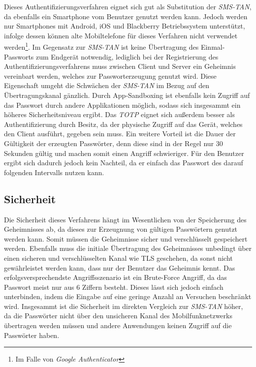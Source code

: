 \documentclass[11pt,a4paper,ngerman]{scrreprt}
\begin{document}
Dieses Authentifizierungsverfahren eignet sich gut als Substitution der \textit{SMS-TAN}, da ebenfalls ein Smartphone vom Benutzer genutzt werden kann. Jedoch werden nur Smartphones mit Android, iOS und Blackberry Betriebssystem unterstützt, infolge dessen können alte Mobiltelefone für dieses Verfahren nicht verwendet werden\footnote{Im Falle von \textit{Google Authenticator}}. Im Gegensatz zur \textit{SMS-TAN} ist keine Übertragung des Einmal-Passworts zum Endgerät notwendig, lediglich bei der Registrierung des Authentifizierungsverfahrens muss zwischen Client und Server ein Geheimnis vereinbart werden, welches zur Passworterzeugung genutzt wird. Diese Eigenschaft umgeht die Schwächen der \textit{SMS-TAN} im Bezug auf den Übertragungskanal gänzlich. Durch App-Sandboxing ist ebenfalls kein Zugriff auf das Passwort durch andere Applikationen möglich, sodass sich insgesammt ein höheres Sicherheitsniveau ergibt. Das \textit{TOTP} eignet sich außerdem besser als Authentifizierung durch Besitz, da der physische Zugriff auf das Gerät, welches den Client ausführt, gegeben sein muss. Ein weitere Vorteil ist die Dauer der Gültigkeit der erzeugten Passwörter, denn diese sind in der Regel nur 30 Sekunden gültig und machen somit einen Angriff schwieriger. Für den Benutzer ergibt sich dadurch jedoch kein Nachteil, da er einfach das Passwort des darauf folgenden Intervalls nutzen kann.

\subsection{Sicherheit}
Die Sicherheit dieses Verfahrens hängt im Wesentlichen von der Speicherung des Geheimnisses ab, da dieses zur Erzeugnung von gültigen Passwörtern genutzt werden kann. Somit müssen die Geheimnisse sicher und verschlüsselt gespeichert werden. Ebenfalls muss die initiale Übertragung des Geheimnisses unbedingt über einen sicheren und verschlüsselten Kanal wie TLS geschehen, da sonst nicht gewährleistet werden kann, dass nur der Benutzer das Geheimnis kennt. Das erfolgsversprechendste Angriffsszenario ist ein Brute-Force Angriff, da das Passwort meist nur aus 6 Ziffern besteht. Dieses lässt sich jedoch einfach unterbinden, indem die Eingabe auf eine geringe Anzahl an Versuchen beschränkt wird. Insgesammt ist die Sicherheit im direkten Vergleich zur \textit{SMS-TAN} höher, da die Passwörter nicht über den unsicheren Kanal des Mobilfunknetzwerks übertragen werden müssen und andere Anwendungen keinen Zugriff auf die Passwörter haben.
\end{document}
